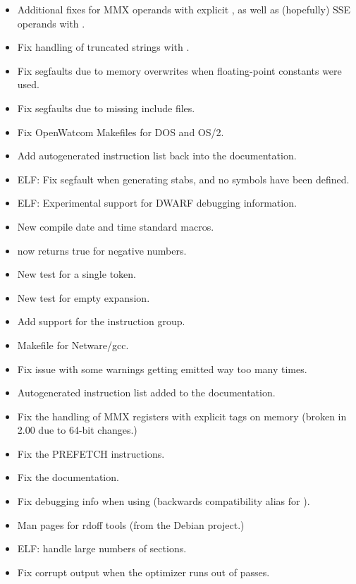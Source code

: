 \begin{itemize}
    \item{Additional fixes for MMX operands with explicit , as well as
        (hopefully) SSE operands with .}
    \item{Fix handling of truncated strings with .}
    \item{Fix segfaults due to memory overwrites when floating-point constants were used.}
    \item{Fix segfaults due to missing include files.}
    \item{Fix OpenWatcom Makefiles for DOS and OS/2.}
    \item{Add autogenerated instruction list back into the documentation.}
    \item{ELF: Fix segfault when generating stabs, and no symbols have been defined.}
    \item{ELF: Experimental support for DWARF debugging information.}
    \item{New compile date and time standard macros.}
    \item{ now returns true for negative numbers.}
    \item{New  test for a single token.}
    \item{New  test for empty expansion.}
    \item{Add support for the  instruction group.}
    \item{Makefile for Netware/gcc.}
    \item{Fix issue with some warnings getting emitted way too many times.}
    \item{Autogenerated instruction list added to the documentation.}
\end{itemize}


\begin{itemize}
    \item{Fix the handling of MMX registers with explicit  tags on
        memory (broken in 2.00 due to 64-bit changes.)}
    \item{Fix the PREFETCH instructions.}
    \item{Fix the documentation.}
    \item{Fix debugging info when using 
        (backwards compatibility alias for ).}
    \item{Man pages for rdoff tools (from the Debian project.)}
    \item{ELF: handle large numbers of sections.}
    \item{Fix corrupt output when the optimizer runs out of passes.}
\end{itemize}

